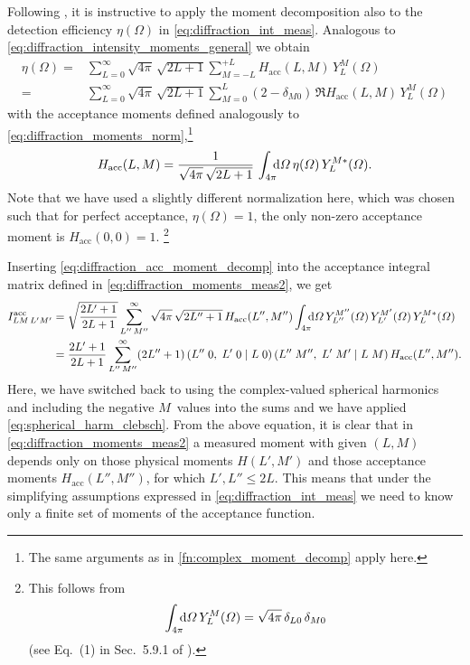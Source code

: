 Following , it is instructive to apply the
moment decomposition also to the detection efficiency $\eta(\Omega)$
in \cref{eq:diffraction_int_meas}.  Analogous to
\cref{eq:diffraction_intensity_moments_general} we obtain
\begin{align}
  \label{eq:diffraction_acc_moment_decomp}
  \eta(\Omega)
  ={}& \sum_{L = 0}^\infty \sqrt{4 \pi}\, \sqrt{2 L + 1} \sum_{M = -L}^{+L} H_\text{acc}(L, M)\, Y_L^M(\Omega)
  \\
  ={}& \sum_{L = 0}^\infty \sqrt{4 \pi}\, \sqrt{2 L + 1} \sum_{M = 0}^{L} (2 - \delta_{M 0})\, \Re{H_\text{acc}(L, M)\, Y_L^M(\Omega)}
\end{align}
with the acceptance moments defined analogously to
\cref{eq:diffraction_moments_norm},\footnote{The same arguments as in
\cref{fn:complex_moment_decomp} apply here.} \ie
\begin{equation}
  \label{eq:diffraction_acc_moment}
  H_\text{acc}(L, M)
  = \frac{1}{\sqrt{4 \pi}\, \sqrt{2 L + 1}}\, \int_{4 \pi}\!\!\! \dif{\Omega}\, \eta(\Omega)\, Y_L^{M *}(\Omega).
\end{equation}
Note that we have used a slightly different normalization here, which
was chosen such that for perfect acceptance, \ie $\eta(\Omega) = 1$,
the only non-zero acceptance moment is $H_\text{acc}(0, 0) = 1$.%
\footnote{%
  This follows from
  \begin{equation}
    \int_{4 \pi}\!\!\! \dif{\Omega}\, Y_L^M(\Omega)
    = \sqrt{4 \pi}\, \delta_{L 0}\, \delta_{M 0}
  \end{equation}
  (see Eq.~(1) in Sec.~5.9.1 of ).
}

Inserting \cref{eq:diffraction_acc_moment_decomp} into the acceptance
integral matrix defined in \cref{eq:diffraction_moments_meas2}, we get
\begin{align}
  I^\text{acc}_{L M\, L' M'}
  ={}& \sqrt{\frac{2 L' + 1}{2 L + 1}} \sum_{L''\, M''}^\infty \sqrt{4 \pi}\, \sqrt{2 L'' + 1}\, H_\text{acc}(L'', M'')
  \int_{4 \pi}\!\!\! \dif{\Omega}\, Y_{L''}^{M''}(\Omega)\, Y_{L'}^{M'}(\Omega)\, Y_L^{M *}(\Omega) \notag
  \\
  \label{eq:diffraction_acc_int_moment_decomp}
  ={}& \frac{2 L' + 1}{2 L + 1} \sum_{L''\, M''}^\infty (2 L'' + 1)\,
  \clebsch{L''}{0}{L'}{0}{L}{0}\, \clebsch{L''}{M''}{L'}{M'}{L}{M}\, H_\text{acc}(L'', M'').
\end{align}
Here, we have switched back to using the complex-valued spherical
harmonics and including the negative $M$~values into the sums and we
have applied \cref{eq:spherical_harm_clebsch}.  From the above
equation, it is clear that in \cref{eq:diffraction_moments_meas2} a
measured moment with given $(L, M)$ depends only on those physical
moments $H(L', M')$ and those acceptance moments $H_\text{acc}(L'',
M'')$, for which $L', L'' \leq 2 L$.  This means that under the
simplifying assumptions expressed in \cref{eq:diffraction_int_meas} we
need to know only a finite set of moments of the acceptance function.


